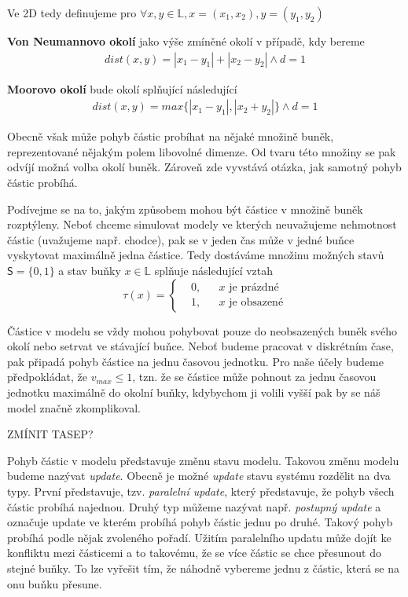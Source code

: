 \documentclass[a4paper, 12pt, fleqn]{article}
\begin{document}
	
	Ve 2D tedy definujeme pro $ \forall x,y \in \mathbb{L}, x = (x_{1}, x_{2}), y = (y_{1}, y_{2}) $
	
	\textbf{Von Neumannovo okolí} jako výše zmíněné okolí v případě, kdy bereme 
	\begin{align}
	dist(x,y) = |x_{1} - y_{1}| + |x_{2} - y_{2}| \wedge d = 1 \label{VonNeumann}
	\end{align}
	
	\textbf{Moorovo okolí} bude okolí splňující následující
	\begin{align}
	dist(x,y) = max\{|x_{1} - y_{1}|,|x_{2} + y_{2}|\} \wedge d = 1 \label{Moor}
	\end{align}
	
	Obecně však může pohyb částic probíhat na nějaké množině buněk, reprezentované nějakým polem libovolné dimenze. Od tvaru této množiny se pak odvíjí možná volba okolí buněk. Zároveň zde vyvstává otázka, jak samotný pohyb částic probíhá.
	
	Podívejme se na to, jakým způsobem mohou být částice v množině buněk rozptýleny. Neboť chceme simulovat modely ve kterých neuvažujeme nehmotnost částic (uvažujeme např. chodce), pak se v jeden čas může v jedné buňce vyskytovat maximálně jedna částice. Tedy dostáváme množinu možných stavů $ \mathsf{S} = \{0, 1\} $ a stav buňky $ x \in \mathbb{L} $ splňuje následující vztah 
	\begin{equation}
	\tau(x)= \left \{
	\begin{aligned}
	&0, && x\text{ je prázdné} \\
	&1, && x\text{ je obsazené}
	\end{aligned} \right.
	\end{equation}
	
	Částice v modelu se vždy mohou pohybovat pouze do neobsazených buněk svého okolí nebo setrvat ve stávající buňce. Neboť budeme pracovat v diskrétním čase, pak připadá pohyb částice na jednu časovou jednotku. Pro naše účely budeme předpokládat, že $ v_{max} \leq 1 $, tzn. že se částice může pohnout za jednu časovou jednotku maximálně do okolní buňky, kdybychom ji volili vyšší pak by se náš model značně zkomplikoval.
	
	ZMÍNIT TASEP?
	
	Pohyb částic v modelu představuje změnu stavu modelu. Takovou změnu modelu budeme nazývat \textit{update}. Obecně je možné \textit{update} stavu systému rozdělit na dva typy. První představuje, tzv. \textit{paralelní update}, který představuje, že pohyb všech částic probíhá najednou. Druhý typ  můžeme nazývat např. \textit{postupný update} a označuje update ve kterém probíhá pohyb částic jednu po druhé. Takový pohyb probíhá podle nějak zvoleného pořadí. Užitím paralelního updatu může dojít ke konfliktu mezi částicemi a to takovému, že se více částic se chce přesunout do stejné buňky. To lze vyřešit tím, že náhodně vybereme jednu z částic, která se na onu buňku přesune.
	
\end{document}

